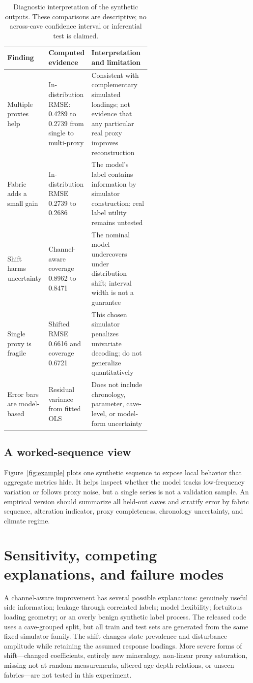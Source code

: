 \documentclass[11pt,a4paper]{article}
\begin{document}
\begin{table}[!htbp]\centering\small
\caption{Diagnostic interpretation of the synthetic outputs. These comparisons are descriptive; no across-cave confidence interval or inferential test is claimed.}\label{tab:diagnostics}
\begin{tabularx}{\linewidth}{p{0.28\linewidth}p{0.30\linewidth}X}\toprule
Finding & Computed evidence & Interpretation and limitation \\\midrule
Multiple proxies help & In-distribution RMSE: 0.4289 to 0.2739 from single to multi-proxy & Consistent with complementary simulated loadings; not evidence that any particular real proxy improves reconstruction \\
Fabric adds a small gain & In-distribution RMSE 0.2739 to 0.2686 & The model's label contains information by simulator construction; real label utility remains untested \\
Shift harms uncertainty & Channel-aware coverage 0.8962 to 0.8471 & The nominal model undercovers under distribution shift; interval width is not a guarantee \\
Single proxy is fragile & Shifted RMSE 0.6616 and coverage 0.6721 & This chosen simulator penalizes univariate decoding; do not generalize quantitatively \\
Error bars are model-based & Residual variance from fitted OLS & Does not include chronology, parameter, cave-level, or model-form uncertainty \\
\bottomrule\end{tabularx}\end{table}

\subsection{A worked-sequence view}
Figure~\ref{fig:example} plots one synthetic sequence to expose local behavior that aggregate metrics hide. It helps inspect whether the model tracks low-frequency variation or follows proxy noise, but a single series is not a validation sample. An empirical version should summarize all held-out caves and stratify error by fabric sequence, alteration indicator, proxy completeness, chronology uncertainty, and climate regime.

\section{Sensitivity, competing explanations, and failure modes}
A channel-aware improvement has several possible explanations: genuinely useful side information; leakage through correlated labels; model flexibility; fortuitous loading geometry; or an overly benign synthetic label process. The released code uses a cave-grouped split, but all train and test sets are generated from the same fixed simulator family. The shift changes state prevalence and disturbance amplitude while retaining the assumed response loadings. More severe forms of shift—changed coefficients, entirely new mineralogy, non-linear proxy saturation, missing-not-at-random measurements, altered age-depth relations, or unseen fabrics—are not tested in this experiment.
\end{document}
